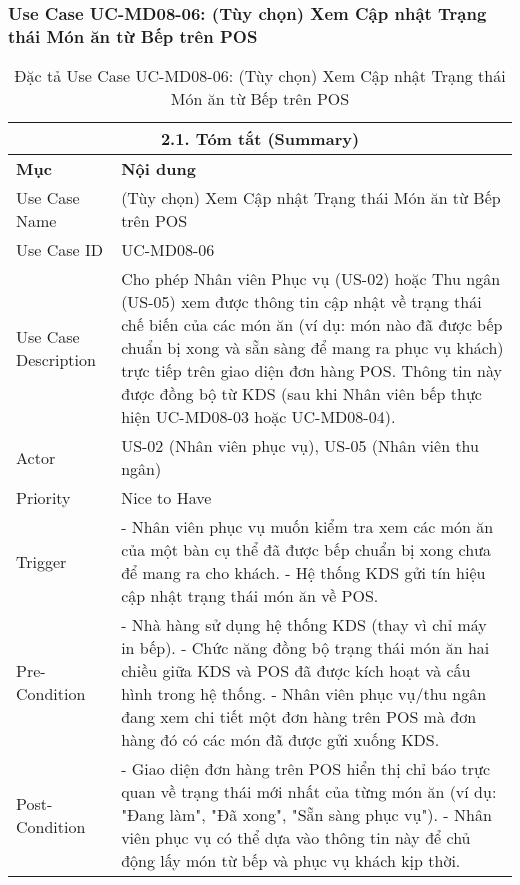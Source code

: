 \subsubsection{Use Case UC-MD08-06: (Tùy chọn) Xem Cập nhật Trạng thái Món ăn từ Bếp trên POS}
\begin{longtable}{|m{4cm}|p{11cm}|}
\caption{Đặc tả Use Case UC-MD08-06: (Tùy chọn) Xem Cập nhật Trạng thái Món ăn từ Bếp trên POS} \label{tab:uc_md08_06_final_v2} \\
\hline
\multicolumn{2}{|c|}{\textbf{2.1. Tóm tắt (Summary)}} \\
\hline
\textbf{Mục} & \textbf{Nội dung} \\
\hline
\endhead %
\hline
\endfoot %
\hline
\endlastfoot %
Use Case Name & (Tùy chọn) Xem Cập nhật Trạng thái Món ăn từ Bếp trên POS \\
\hline
Use Case ID & UC-MD08-06 \\
\hline
Use Case Description & Cho phép Nhân viên Phục vụ (US-02) hoặc Thu ngân (US-05) xem được thông tin cập nhật về trạng thái chế biến của các món ăn (ví dụ: món nào đã được bếp chuẩn bị xong và sẵn sàng để mang ra phục vụ khách) trực tiếp trên giao diện đơn hàng POS. Thông tin này được đồng bộ từ KDS (sau khi Nhân viên bếp thực hiện UC-MD08-03 hoặc UC-MD08-04). \\
\hline
Actor & US-02 (Nhân viên phục vụ), US-05 (Nhân viên thu ngân) \\
\hline
Priority & Nice to Have \\
\hline
Trigger & - Nhân viên phục vụ muốn kiểm tra xem các món ăn của một bàn cụ thể đã được bếp chuẩn bị xong chưa để mang ra cho khách. \newline - Hệ thống KDS gửi tín hiệu cập nhật trạng thái món ăn về POS. \\
\hline
Pre-Condition & - Nhà hàng sử dụng hệ thống KDS (thay vì chỉ máy in bếp). \newline - Chức năng đồng bộ trạng thái món ăn hai chiều giữa KDS và POS đã được kích hoạt và cấu hình trong hệ thống. \newline - Nhân viên phục vụ/thu ngân đang xem chi tiết một đơn hàng trên POS mà đơn hàng đó có các món đã được gửi xuống KDS. \\
\hline
Post-Condition & - Giao diện đơn hàng trên POS hiển thị chỉ báo trực quan về trạng thái mới nhất của từng món ăn (ví dụ: "Đang làm", "Đã xong", "Sẵn sàng phục vụ"). \newline - Nhân viên phục vụ có thể dựa vào thông tin này để chủ động lấy món từ bếp và phục vụ khách kịp thời. \\

\end{longtable}
